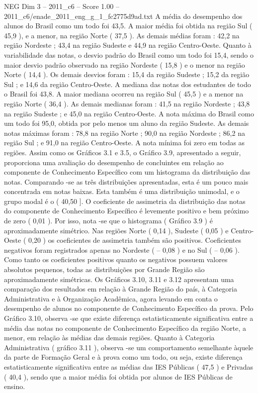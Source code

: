 \begin{textsample}{NEG Dim 3 – 2011\_c6 – Score 1.00 – 2011\_c6/enade\_2011\_eng\_g\_1\_fc2775d9ad.txt}
A média do desempenho dos alunos do Brasil como um todo foi 43,5.
A maior média foi obtida na região Sul ( 45,9 ), e a menor, na região Norte ( 37,5 ).
As demais médias foram : 42,2 na região Nordeste ; 43,4 na região Sudeste e 44,9 na região Centro-Oeste.
Quanto à variabilidade das notas, o desvio padrão do Brasil como um todo foi 15,4, sendo o maior desvio padrão observado na região Nordeste ( 15,8 ) e o menor na região Norte ( 14,4 ).
Os demais desvios foram : 15,4 da região Sudeste ; 15,2 da região Sul ; e 14,6 da região Centro-Oeste.
A mediana das notas dos estudantes de todo o Brasil foi 43,8.
A maior mediana ocorreu na região Sul ( 45,5 ) e a menor na região Norte ( 36,4 ).
As demais medianas foram : 41,5 na região Nordeste ; 43,8 na região Sudeste ; e 45,0 na região Centro-Oeste.
A nota máxima do Brasil como um todo foi 95,0, obtida por pelo menos um aluno da região Sudeste.
As demais notas máximas foram : 78,8 na região Norte ; 90,0 na região Nordeste ; 86,2 na região Sul ; e 91,0 na região Centro-Oeste.
A nota mínima foi zero em todas as regiões.
Assim como os Gráficos 3.1 e 3.5, o Gráfico 3.9, apresentado a seguir, proporciona uma avaliação do desempenho de concluintes em relação ao componente de Conhecimento Específico com um histograma da distribuição das notas.
Comparando -se as três distribuições apresentadas, esta é um pouco mais concentrada em notas baixas.
Esta também é uma distribuição unimodal, e o grupo modal é o ( 40,50 ].
O coeficiente de assimetria da distribuição das notas do componente de Conhecimento Específico é levemente positivo e bem próximo de zero ( 0,01 ).
Por isso, nota -se que o histograma ( Gráfico 3.9 ) é aproximadamente simétrico.
Nas regiões Norte ( 0,14 ), Sudeste ( 0,05 ) e Centro-Oeste ( 0,20 ) os coeficientes de assimetria também são positivos.
Coeficientes negativos foram registrados apenas no Nordeste ( – 0,08 ) e no Sul ( – 0,06 ).
Como tanto os coeficientes positivos quanto os negativos possuem valores absolutos pequenos, todas as distribuições por Grande Região são aproximadamente simétricas.
Os Gráficos 3.10, 3.11 e 3.12 apresentam uma comparação dos resultados em relação à Grande Região do país, à Categoria Administrativa e à Organização Acadêmica, agora levando em conta o desempenho de alunos no componente de Conhecimento Específico da prova.
Pelo Gráfico 3.10, observa -se que existe diferença estatisticamente significativa entre a média das notas no componente de Conhecimento Específico da região Norte, a menor, em relação às médias das demais regiões.
Quanto à Categoria Administrativa ( gráfico 3.11 ), observa -se um comportamento semelhante àquele da parte de Formação Geral e à prova como um todo, ou seja, existe diferença estatisticamente significativa entre as médias das IES Públicas ( 47,5 ) e Privadas ( 40,4 ), sendo que a maior média foi obtida por alunos de IES Públicas de ensino.

\end{textsample}
